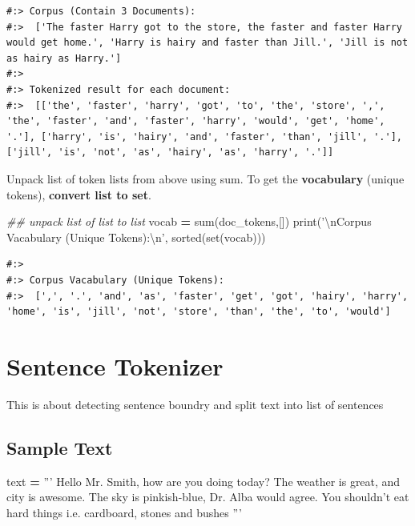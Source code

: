 \documentclass[
]{book}
\newenvironment{Shaded}{\begin{snugshade}}{\end{snugshade}}
\newcommand{\BuiltInTok}[1]{#1}
\newcommand{\CharTok}[1]{\textcolor[rgb]{0.5,0.5,0.5}{#1}}
\newcommand{\CommentTok}[1]{\textcolor[rgb]{0.37,0.37,0.37}{\textit{#1}}}
\newcommand{\NormalTok}[1]{#1}
\newcommand{\OperatorTok}[1]{\textcolor[rgb]{0.43,0.43,0.43}{\textbf{#1}}}
\newcommand{\StringTok}[1]{\textcolor[rgb]{0.5,0.5,0.5}{#1}}
\begin{document}
\begin{verbatim}
#:> Corpus (Contain 3 Documents):
#:>  ['The faster Harry got to the store, the faster and faster Harry would get home.', 'Harry is hairy and faster than Jill.', 'Jill is not as hairy as Harry.'] 
#:>  
#:> Tokenized result for each document: 
#:>  [['the', 'faster', 'harry', 'got', 'to', 'the', 'store', ',', 'the', 'faster', 'and', 'faster', 'harry', 'would', 'get', 'home', '.'], ['harry', 'is', 'hairy', 'and', 'faster', 'than', 'jill', '.'], ['jill', 'is', 'not', 'as', 'hairy', 'as', 'harry', '.']]
\end{verbatim}

Unpack list of token lists from above using sum. To get the \textbf{vocabulary} (unique tokens), \textbf{convert list to set}.

\begin{Shaded}
\begin{Highlighting}[]
\CommentTok{## unpack list of list to list}
\NormalTok{vocab }\OperatorTok{=} \BuiltInTok{sum}\NormalTok{(doc_tokens,[])}
\BuiltInTok{print}\NormalTok{(}\StringTok{'}\CharTok{\textbackslash{}n}\StringTok{Corpus Vacabulary (Unique Tokens):}\CharTok{\textbackslash{}n}\StringTok{'}\NormalTok{,}
       \BuiltInTok{sorted}\NormalTok{(}\BuiltInTok{set}\NormalTok{(vocab)))}
\end{Highlighting}
\end{Shaded}

\begin{verbatim}
#:> 
#:> Corpus Vacabulary (Unique Tokens):
#:>  [',', '.', 'and', 'as', 'faster', 'get', 'got', 'hairy', 'harry', 'home', 'is', 'jill', 'not', 'store', 'than', 'the', 'to', 'would']
\end{verbatim}

\hypertarget{sentence-tokenizer}{%
\section{Sentence Tokenizer}\label{sentence-tokenizer}}

This is about detecting sentence boundry and split text into list of sentences

\hypertarget{sample-text}{%
\subsection{Sample Text}\label{sample-text}}

\begin{Shaded}
\begin{Highlighting}[]
\NormalTok{text }\OperatorTok{=} \StringTok{'''}
\StringTok{Hello Mr. Smith, how are you doing today?}
\StringTok{The weather is great, and city is awesome.}
\StringTok{The sky is pinkish-blue, Dr. Alba would agree.}
\StringTok{You shouldn't eat hard things i.e. cardboard, stones and bushes}
\StringTok{'''}
\end{Highlighting}
\end{Shaded}
\end{document}
